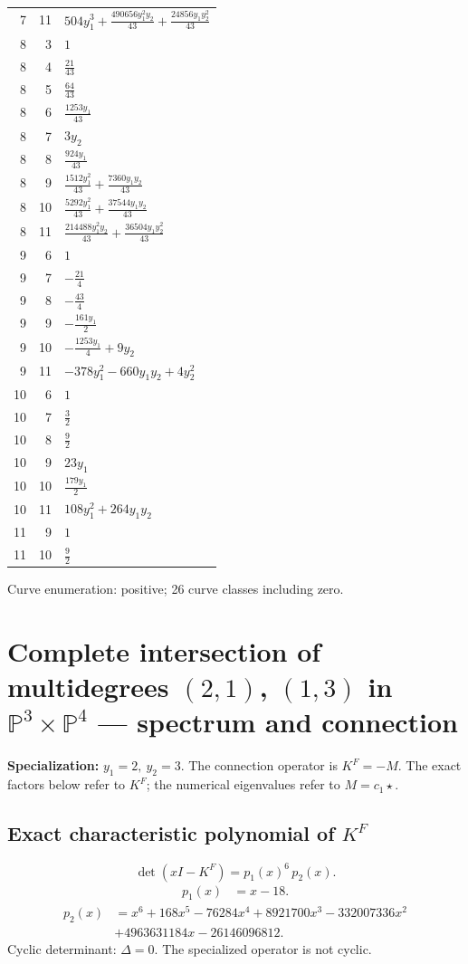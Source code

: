 \documentclass[10pt,a4paper]{article}
\begin{document}
{\begin{longtable}{rrp{125mm}}
7 & 11 & $504 y_{1}^{3} + \frac{490656 y_{1}^{2} y_{2}}{43} + \frac{24856 y_{1} y_{2}^{2}}{43}$\\
8 & 3 & $1$\\
8 & 4 & $\frac{21}{43}$\\
8 & 5 & $\frac{64}{43}$\\
8 & 6 & $\frac{1253 y_{1}}{43}$\\
8 & 7 & $3 y_{2}$\\
8 & 8 & $\frac{924 y_{1}}{43}$\\
8 & 9 & $\frac{1512 y_{1}^{2}}{43} + \frac{7360 y_{1} y_{2}}{43}$\\
8 & 10 & $\frac{5292 y_{1}^{2}}{43} + \frac{37544 y_{1} y_{2}}{43}$\\
8 & 11 & $\frac{214488 y_{1}^{2} y_{2}}{43} + \frac{36504 y_{1} y_{2}^{2}}{43}$\\
9 & 6 & $1$\\
9 & 7 & $- \frac{21}{4}$\\
9 & 8 & $- \frac{43}{4}$\\
9 & 9 & $- \frac{161 y_{1}}{2}$\\
9 & 10 & $- \frac{1253 y_{1}}{4} + 9 y_{2}$\\
9 & 11 & $- 378 y_{1}^{2} - 660 y_{1} y_{2} + 4 y_{2}^{2}$\\
10 & 6 & $1$\\
10 & 7 & $\frac{3}{2}$\\
10 & 8 & $\frac{9}{2}$\\
10 & 9 & $23 y_{1}$\\
10 & 10 & $\frac{179 y_{1}}{2}$\\
10 & 11 & $108 y_{1}^{2} + 264 y_{1} y_{2}$\\
11 & 9 & $1$\\
11 & 10 & $\frac{9}{2}$\\
\end{longtable}}
Curve enumeration: positive; 26 curve classes including zero.
\clearpage\section*{Complete intersection of multidegrees $(2,1)$, $(1,3)$ in $\mathbb P^{3}\times \mathbb P^{4}$ --- spectrum and connection}
\textbf{Specialization:} $y_1=2,\ y_2=3$. The connection operator is $K^F=-M$. The exact factors below refer to $K^F$; the numerical eigenvalues refer to $M=c_1\star$.
\subsection*{Exact characteristic polynomial of $K^F$}
\[\det(xI-K^F)=p_{1}(x)^{6}\,p_{2}(x).\]
\[\begin{aligned}p_{1}(x)&=x - 18.\end{aligned}\]
\[\begin{aligned}p_{2}(x)&=x^{6} + 168 x^{5} - 76284 x^{4} + 8921700 x^{3} - 332007336 x^{2}\\&+4963631184 x - 26146096812.\end{aligned}\]
Cyclic determinant: $\Delta=0$. The specialized operator is not cyclic.
\end{document}
